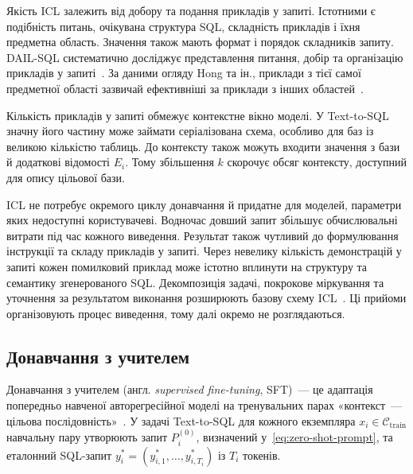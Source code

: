 \documentclass[a4paper,14pt,oneside]{extreport}
\begin{document}
Якість ICL залежить від добору та подання прикладів у запиті. Істотними є подібність питань, очікувана структура SQL, складність прикладів і їхня предметна область. Значення також мають формат і порядок складників запиту. DAIL-SQL систематично досліджує представлення питання, добір та організацію прикладів у запиті~\cite{gao2024benchmark}. За даними огляду Hong та ін., приклади з тієї самої предметної області зазвичай ефективніші за приклади з інших областей~\cite{hong2025nextgeneration}.

Кількість прикладів у запиті обмежує контекстне вікно моделі. У Text-to-SQL значну його частину може займати серіалізована схема, особливо для баз із великою кількістю таблиць. До контексту також можуть входити значення з бази й додаткові відомості \(E_i\). Тому збільшення \(k\) скорочує обсяг контексту, доступний для опису цільової бази.

ICL не потребує окремого циклу донавчання й придатне для моделей, параметри яких недоступні користувачеві. Водночас довший запит збільшує обчислювальні витрати під час кожного виведення. Результат також чутливий до формулювання інструкції та складу прикладів у запиті. Через невелику кількість демонстрацій у запиті кожен помилковий приклад може істотно вплинути на структуру та семантику згенерованого SQL. Декомпозиція задачі, покрокове міркування та уточнення за результатом виконання розширюють базову схему ICL~\cite{hong2025nextgeneration}. Ці прийоми організовують процес виведення, тому далі окремо не розглядаються.

\subsection{Донавчання з учителем}

Донавчання з учителем (англ. \textit{supervised fine-tuning}, SFT)~--- це адаптація попередньо навченої авторегресійної моделі на тренувальних парах «контекст~--- цільова послідовність»~\cite{hong2025nextgeneration}. У задачі Text-to-SQL для кожного екземпляра \(x_i\in\mathcal C_{\mathrm{train}}\) навчальну пару утворюють запит \(P_i^{(0)}\), визначений у~\eqref{eq:zero-shot-prompt}, та еталонний SQL-запит \(y_i^*=(y_{i,1}^*,\ldots,y_{i,T_i}^*)\) із \(T_i\) токенів.
\end{document}
